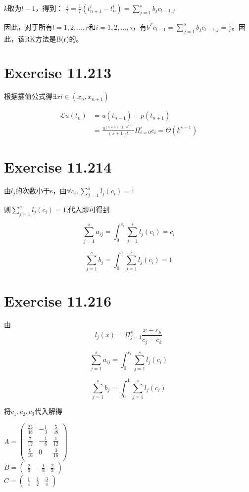 \documentclass[twoside,a4paper]{article}
\begin{document}
$k$取为$l-1$，得到：
$\frac{1}{l}=\frac{1}{l}(t_{n+1}^{l}-t_{n}^{l})=\sum_{j=1}^sb_jc_{l-1,j}$

因此，对于所有$l = 1, 2, \dots, r$和$i = 1, 2, \dots, s$，有$b^Tc_{l-1} = \sum_{j=1}^sb_jc_{l-1,j} = \frac{1}{l}$。因此，该RK方法是B(r)的。

\section{Exercise 11.213}
根据插值公式得$\exists xi\in(x_n,x_{n+1})$

$$\begin{aligned}
\mathcal{L}u(t_n) &=u(t_{n+1})-p(t_{n+1})\\
&=\frac{u^{(s+1)(\xi)k^{s+1}}}{(s+1)!}\Pi_{i=0}^sc_i=\Theta(k^{s+1})
\end{aligned}$$


\section{Exercise 11.214}
由$l_j$的次数小于s，由$\forall c_i,\sum_{j=1}^sl_j(c_i)=1$

则$\sum_{j=1}^sl_j(c_i)=1$,代入即可得到

$$\sum_{j=1}^sa_{ij}=\int_0^{c_i}\sum_{j=1}^sl_j(c_i)=c_i$$

$$\sum_{j=1}^sb_j=\int_0^1\sum_{j=1}^sl_j(c_i)=1$$
\section{Exercise 11.216}
由$$l_j(x)=\Pi_{j=1}^s\frac{x-c_k}{c_j-c_k}$$

$$\sum_{j=1}^sa_{ij}=\int_0^{c_i}\sum_{j=1}^sl_j(c_i)$$

$$\sum_{j=1}^sb_j=\int_0^1\sum_{j=1}^sl_j(c_i)$$

将$c_1,c_2,c_3$代入解得

$A=\begin{pmatrix}
    \frac{23}{48}& -\frac{1}{3} & \frac{5}{48}\\
    \frac{7}{12}& -\frac{1}{6} & \frac{1}{12}\\
    \frac{9}{16}& 0 & \frac{3}{16}\\
    \end{pmatrix}$\\
   $B=\begin{pmatrix}
    \frac{2}{3} & -\frac{1}{3} &\frac{2}{3}
   \end{pmatrix}$\\
   $C=\begin{pmatrix}
    \frac{1}{4} &\frac{1}{2}&\frac{3}{4}
   \end{pmatrix}$
\end{document}
